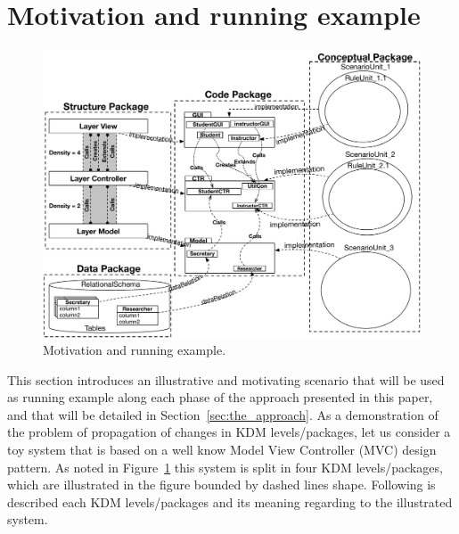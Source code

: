 \section{Motivation and running example} %
\label{sec:motivation_and_running_example}

\begin{figure}
	\centering
	\includegraphics[scale=0.58]{figuras/NewSystemVersion}
	\caption{Motivation and running example.}
	\label{fig:system}
\end{figure}

This section introduces an illustrative and motivating scenario that will be used as running example along each phase of the approach presented in this paper, and that will be detailed in Section~\ref{sec:the_approach}. As a demonstration of the problem of propagation of changes in KDM levels/packages, let us consider a toy system that is based on a well know Model View Controller (MVC) design pattern. As noted in Figure~\ref{fig:system} this system is split in four KDM levels/packages, which are illustrated in the figure bounded by dashed lines shape. Following is described each KDM levels/packages and its meaning regarding to the illustrated system.

